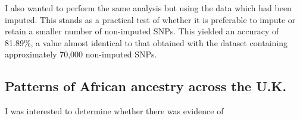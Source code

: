 I also wanted to perform the same analysis but using the data which had been imputed. This stands as a practical test of whether it is preferable to impute or retain a smaller number of non-imputed SNPs. This yielded an accuracy of 81.89\%, a value almost identical to that obtained with the dataset containing approximately 70,000 non-imputed SNPs. 


\subsection{Patterns of African ancestry across the U.K.}

I was interested to determine whether there was evidence of 










